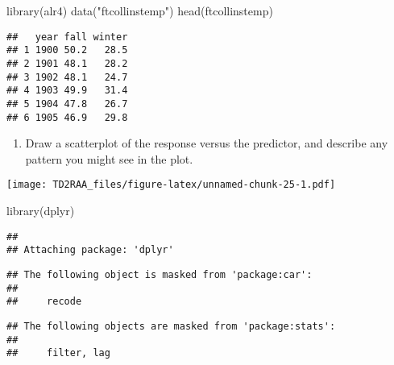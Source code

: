 \documentclass[
]{article}
\newenvironment{Shaded}{\begin{snugshade}}{\end{snugshade}}
\newcommand{\FunctionTok}[1]{\textcolor[rgb]{0.00,0.00,0.00}{#1}}
\newcommand{\NormalTok}[1]{#1}
\newcommand{\SpecialCharTok}[1]{\textcolor[rgb]{0.00,0.00,0.00}{#1}}
\newcommand{\StringTok}[1]{\textcolor[rgb]{0.31,0.60,0.02}{#1}}
\providecommand{\tightlist}{%
  \setlength{\itemsep}{0pt}\setlength{\parskip}{0pt}}
\begin{document}
\begin{Shaded}
\begin{Highlighting}[]
\FunctionTok{library}\NormalTok{(alr4)}
\FunctionTok{data}\NormalTok{(}\StringTok{"ftcollinstemp"}\NormalTok{)}
\FunctionTok{head}\NormalTok{(ftcollinstemp)}
\end{Highlighting}
\end{Shaded}

\begin{verbatim}
##   year fall winter
## 1 1900 50.2   28.5
## 2 1901 48.1   28.2
## 3 1902 48.1   24.7
## 4 1903 49.9   31.4
## 5 1904 47.8   26.7
## 6 1905 46.9   29.8
\end{verbatim}

\begin{enumerate}
\def\labelenumi{\alph{enumi}.}
\tightlist
\item
  Draw a scatterplot of the response versus the predictor, and describe
  any pattern you might see in the plot.
\end{enumerate}

\begin{Shaded}
\end{Shaded}

\texttt{[image: TD2RAA\_files/figure-latex/unnamed-chunk-25-1.pdf]}

\begin{Shaded}
\begin{Highlighting}[]
\FunctionTok{library}\NormalTok{(dplyr)}
\end{Highlighting}
\end{Shaded}

\begin{verbatim}
## 
## Attaching package: 'dplyr'
\end{verbatim}

\begin{verbatim}
## The following object is masked from 'package:car':
## 
##     recode
\end{verbatim}

\begin{verbatim}
## The following objects are masked from 'package:stats':
## 
##     filter, lag
\end{verbatim}
\end{document}
